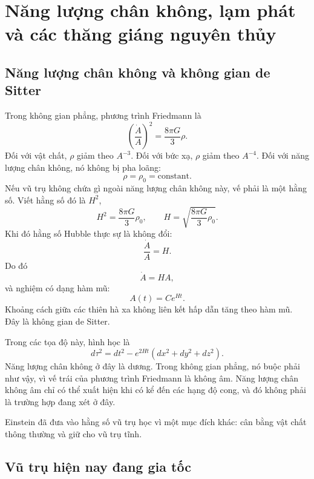 \chapter{Năng lượng chân không, lạm phát và các thăng giáng nguyên thủy}

\section{Năng lượng chân không và không gian de Sitter}

Trong không gian phẳng, phương trình Friedmann là
\begin{equation}
\left(\frac{\dot A}{A}\right)^2=\frac{8\pi G}{3}\rho.
\end{equation}
Đối với vật chất, \(\rho\) giảm theo \(A^{-3}\). Đối với bức xạ, \(\rho\) giảm theo \(A^{-4}\). Đối với năng lượng chân không, nó không bị pha loãng:
\begin{equation}
\rho=\rho_0=\text{constant}.
\end{equation}
Nếu vũ trụ không chứa gì ngoài năng lượng chân không này, vế phải là một hằng số. Viết hằng số đó là \(H^2\),
\begin{equation}
H^2=\frac{8\pi G}{3}\rho_0,
\qquad
H=\sqrt{\frac{8\pi G}{3}\rho_0}.
\end{equation}
Khi đó hằng số Hubble thực sự là không đổi:
\begin{equation}
\frac{\dot A}{A}=H.
\end{equation}
Do đó
\begin{equation}
\dot A=HA,
\end{equation}
và nghiệm có dạng hàm mũ:
\begin{equation}
A(t)=C e^{Ht}.
\end{equation}
Khoảng cách giữa các thiên hà xa không liên kết hấp dẫn tăng theo hàm mũ. Đây là không gian de Sitter.

Trong các tọa độ này, hình học là
\begin{equation}
d\tau^2=dt^2-e^{2Ht}\left(dx^2+dy^2+dz^2\right).
\end{equation}
Năng lượng chân không ở đây là dương. Trong không gian phẳng, nó buộc phải như vậy, vì vế trái của phương trình Friedmann là không âm. Năng lượng chân không âm chỉ có thể xuất hiện khi có kể đến các hạng độ cong, và đó không phải là trường hợp đang xét ở đây.

Einstein đã đưa vào hằng số vũ trụ học vì một mục đích khác: cân bằng vật chất thông thường và giữ cho vũ trụ tĩnh.

\section{Vũ trụ hiện nay đang gia tốc}

